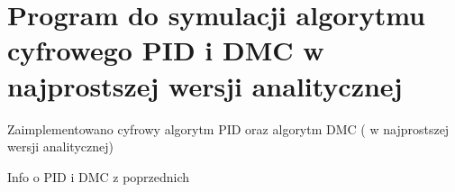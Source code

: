 \section{Program do symulacji algorytmu cyfrowego PID i DMC w najprostszej wersji analitycznej}
\label{projekt:zad3}

Zaimplementowano	cyfrowy	algorytm	PID	oraz	algorytm	DMC	(	w	najprostszej	
wersji	analitycznej)

Info o PID i DMC z poprzednich

\newpage
